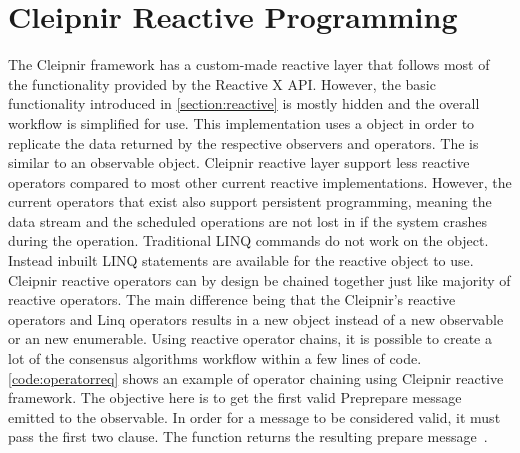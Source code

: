 \section{Cleipnir Reactive Programming}
The Cleipnir framework has a custom-made reactive layer that follows most of the functionality provided by the Reactive X API. However, the basic functionality introduced in \autoref{section:reactive} is mostly hidden and the overall workflow is simplified for use. This implementation uses a  object in order to replicate the data returned by the respective observers and operators. The  is similar to an observable object.
Cleipnir reactive layer support less reactive operators compared to most other current reactive implementations. However, the current operators that exist also support persistent programming, meaning the data stream and the scheduled operations are not lost in if the system crashes during the operation. Traditional LINQ commands do not work on the  object. Instead inbuilt LINQ statements are available for the reactive  object to use. Cleipnir reactive operators can by design be chained together just like majority of reactive operators. The main difference being that the Cleipnir's reactive operators and Linq operators results in a new  object instead of a new observable or an new enumerable. Using reactive operator chains, it is possible to create a lot of the consensus algorithms workflow within a few lines of code. \autoref{code:operatorreq} shows an example of operator chaining using Cleipnir reactive framework. The objective here is to get the first valid Preprepare message emitted to the observable. In order for a message to be considered valid, it must pass the first two  clause. The  function returns the resulting prepare message~\cites[p.~6,8,13]{PAPER:PaxosCleipnir, WEB:ReactiveOperator}.


